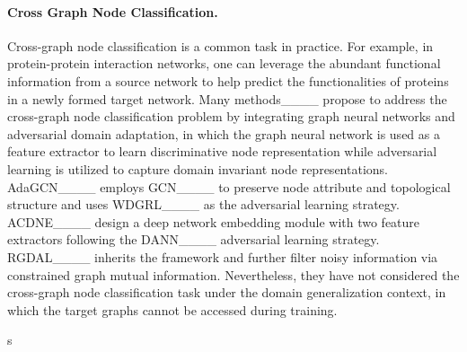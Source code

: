 \paragraph{Cross Graph Node Classification.}
Cross-graph node classification is a common task in practice. For example, in protein-protein interaction networks, one can leverage the abundant functional information from a source network to help predict the functionalities of proteins in a newly formed target network.
Many methods____ propose to address the cross-graph node classification problem by integrating graph neural networks and adversarial domain adaptation, in which the graph neural network is used as a feature extractor to learn discriminative node representation while adversarial learning is utilized to capture domain invariant node representations. AdaGCN____ employs GCN____ to preserve node attribute and topological structure and uses WDGRL____ as the adversarial learning strategy. ACDNE____ design a deep network embedding module with two feature extractors following the DANN____ adversarial learning strategy. RGDAL____ inherits the framework and further filter noisy information via constrained graph mutual information. Nevertheless, they have not considered the cross-graph node classification task under the domain generalization context, in which the target graphs cannot be accessed during training.


s